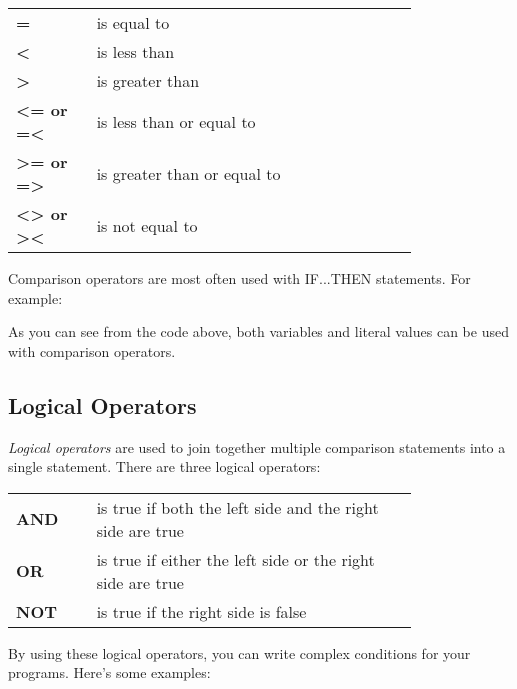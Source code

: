 \begin{tabular}{l p{0.8\linewidth}}
	\ttfamily\bfseries{=}&is equal to\\
	\ttfamily\bfseries{<}&is less than\\
	\ttfamily\bfseries{>}&is greater than\\
	\ttfamily\bfseries{<= or =<}&is less than or equal to\\
	\ttfamily\bfseries{>= or =>}&is greater than or equal to\\
	\ttfamily\bfseries{<> or ><}&is not equal to\\
\end{tabular}

\vspace{16pt}

Comparison operators are most often used with {\ttfamily IF...THEN} statements.
For example:\\


As you can see from the code above, both variables and literal values can be
used with comparison operators.\\

\subsection{Logical Operators}

\emph{Logical operators} are used to join together multiple comparison
statements into a single statement.  There are three logical operators:\\

\begin{tabular}{l p{0.8\linewidth}}
	\ttfamily\bfseries{AND}&is true if both the left side and the right side are true\\
	\ttfamily\bfseries{OR}&is true if either the left side or the right side are true\\
	\ttfamily\bfseries{NOT}&is true if the right side is false\\
\end{tabular}

\vspace{16pt}

By using these logical operators, you can write complex conditions for your
programs.  Here's some examples:\\

